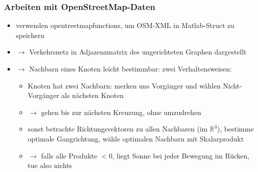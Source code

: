\documentclass[aspectratio=43]{beamer}
\begin{document}
\begin{frame}
    \frametitle{Arbeiten mit OpenStreetMap-Daten}
    \begin{itemize}
        \item verwenden opentreetmapfunctions, um OSM-XML in Matlab-Struct zu speichern
        \item[]$\rightarrow$ Verkehrsnetz in Adjazenzmatrix des ungerichteten Graphen
            dargestellt
        \item[]$\rightarrow$ Nachbarn eines Knoten leicht bestimmbar: zwei
            Verhaltensweisen:
            \begin{itemize}
                \item Knoten hat zwei Nachbarn: merken uns Vorgänger und wählen
                    Nicht-Vorgänger als nächsten Knoten
                \item[]$\rightarrow$ gehen bis zur nächsten Kreuzung, ohne umzudrehen
                \item sonst betrachte Richtungsvektoren zu allen Nachbaren (im $\mathbb
                    R^3$), bestimme optimale Gangrichtung, wähle optimalen Nachbarn mit
                    Skalarprodukt
                \item[]$\rightarrow$ falls alle Produkte $<0$, liegt Sonne bei jeder
                    Bewegung im Rücken, tue also nichts
            \end{itemize}
    \end{itemize}
\end{frame}
\end{document}
